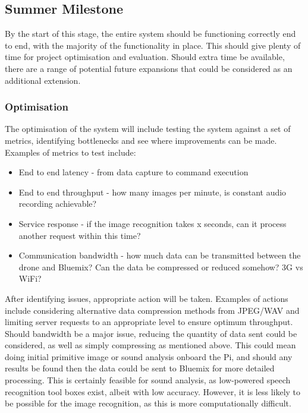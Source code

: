 \documentclass{article}
\begin{document}
\subsection{Summer Milestone}
By the start of this stage, the entire system should be functioning correctly end to end, with the majority of the functionality in place. This should give plenty of time for project optimisation and evaluation. Should extra time be available, there are a range of potential future expansions that could be considered as an additional extension.

\subsubsection{Optimisation}
The optimisation of the system will include testing the system against a set of metrics, identifying bottlenecks and see where improvements can be made. Examples of metrics to test include:
\begin{itemize}
    \item End to end latency - from data capture to command execution
    \item End to end throughput - how many images per minute, is constant audio recording achievable?
    \item Service response - if the image recognition takes x seconds, can it process another request within this time?
    \item Communication bandwidth - how much data can be transmitted between the drone and Bluemix? Can the data be compressed or reduced somehow? 3G vs WiFi?
\end{itemize}
After identifying issues, appropriate action will be taken. Examples of actions include considering alternative data compression methods from JPEG/WAV and limiting server requests to an appropriate level to ensure optimum throughput. Should bandwidth be a major issue, reducing the quantity of data sent could be considered, as well as simply compressing as mentioned above. This could mean doing initial primitive image or sound analysis onboard the Pi, and should any results be found then the data could be sent to Bluemix for more detailed processing. This is certainly feasible for sound analysis, as low-powered speech recognition tool boxes exist, albeit with low accuracy. However, it is less likely to be possible for the image recognition, as this is more computationally difficult.
\end{document}
